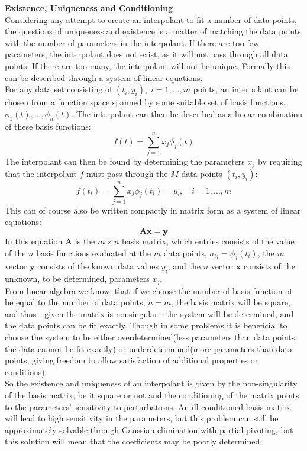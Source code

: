 \documentclass[../../CompleteThesis/Complete_1stDraft]{subfiles}
\begin{document}
\textbf{Existence, Uniqueness and Conditioning}\\
Considering any attempt to create an interpolant to fit a number of data points, the questions of uniqueness and existence is a matter of matching the data points with the number of parameters in the interpolant. If there are too few parameters, the interpolant does not exist, as it will not pass through all data points. If there are too many, the interpolant will not be unique. Formally this can be described through a system of linear equations.\\
For any data set consisting of $(t_i, y_i),\; i=1,...,m$ points, an interpolant can be chosen from a function space spanned by some suitable set of basis functions, $\phi_1(t),...,\phi_n(t)$. The interpolant can then be described as a linear combination of these basis functions:
\begin{equation}
	f(t) = \sum_{j=1}^{n} x_j\phi_j(t)
\end{equation}
The interpolant can then be found by determining the parameters $x_j$ by requiring that the interpolant $f$ must pass through the $M$ data points $(t_i,y_i)$:
\begin{equation}
	f(t_i) = \sum_{j=1}^{n} x_j\phi_j(t_i) = y_i, \quad i=1,...,m
\end{equation}
This can of course also be written compactly in matrix form as a system of linear equations:
\begin{equation}
	\boldsymbol{A}\boldsymbol{x}=\boldsymbol{y}
\end{equation}
In this equation $\boldsymbol{A}$ is the $m\times n$ basis matrix, which entries consists of the value of the $n$ basis functions evaluated at the $m$ data points, $a_{ij}=\phi_j(t_i)$, the $m$ vector $\boldsymbol{y}$ consists of the known data values $y_i$, and the $n$ vector $\boldsymbol{x}$ consists of the unknown, to be determined, parameters $x_j$.\\
From linear algebra we know, that if we choose the number of basis function ot be equal to the number of data points, $n=m$, the basis matrix will be square, and thus - given the matrix is nonsingular - the system will be determined, and the data points can be fit exactly. Though in some problems it is beneficial to choose the system to be either overdetermined(less parameters than data points, the data cannot be fit exactly) or underdetermined(more parameters than data points, giving freedom to allow satisfaction of additional properties or conditions).\\ 
So the existence and uniqueness of an interpolant is given by the non-singularity of the basis matrix, be it square or not and the conditioning of the matrix points to the parameters' sensitivity to perturbations. An ill-conditioned basis matrix will lead to high sensitivity in the parameters, but this problem can still be approximately solvable through Gaussian elimination with partial pivoting, but this solution will mean that the coefficients may be poorly determined.
\end{document}
